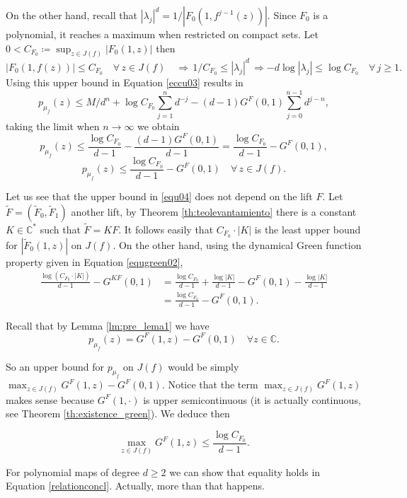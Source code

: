 On the other hand, recall that $|\lambda_j|^d = 1/|F_0(1,f^{j-1}(z))|$. Since $F_0$ is a polynomial, it reaches a maximum when restricted on compact sets. Let $0<C_{F_0}\coloneqq \sup_{z\in J(f)}|F_0(1,z)|$ then
$$|F_0(1,f(z))|\leq C_{F_0} \quad \forall\, z\in J(f)\quad \Rightarrow \, 1/C_{F_0} \leq |\lambda_j|^d  \, \Rightarrow -d \log|\lambda_j| \leq \log C_{F_0} \quad \forall \, j\geq 1.$$
Using this upper bound in Equation \eqref{eccu03} results in
$$p_{\mu_f}(z) \leq M/d^n + \log C_{F_0}\sum_{j=1}^{n}d^{-j} - (d-1)G^F(0,1)\sum_{j=0}^{n-1}d^{j-n},$$
taking the limit when $n\rightarrow \infty$ we obtain
$$p_{\mu_f}(z) \leq \frac{\log C_{F_0}}{d-1} -\frac{(d-1)G^F(0,1)}{d-1} = \frac{\log C_{F_0}}{d-1} -G^F(0,1),$$
\begin{equation}\label{equ04}
p_{\mu_f}(z) \leq \frac{\log C_{F_0}}{d-1} -G^F(0,1) \quad \forall\,z\in J(f).
\end{equation}

Let us see that the upper bound in \eqref{equ04} does not depend on the lift $F$. Let $\tilde{F}=(\tilde{F}_0,\tilde{F}_1)$ another lift, by Theorem \ref{th:teolevantamiento} there is a constant $K\in \mathbb{C}^*$ such that $\tilde{F} = K F$. It follows easily that $C_{F_0}\cdot |K|$ is the least upper bound for $|\tilde{F}_0(1,z)|$ on $J(f)$. On the other hand, using the dynamical Green function property given in Equation \eqref{equgreen02},
\begin{align*}
\frac{\log (C_{F_0}\cdot |K|)}{d-1} -G^{KF}(0,1) &= \frac{\log C_{F_0}}{d-1} + \frac{\log|K|}{d-1} -G^F(0,1)- \frac{\log |K|}{d-1}\\ 
&= \frac{\log C_{F_0}}{d-1}-G^F(0,1).
\end{align*}

Recall that by Lemma \ref{lm:pre_lema1} we have
$$p_{\mu_f}(z) = G^F(1,z)-G^F(0,1) \quad \forall z\in \mathbb{C}.$$

So an upper bound for $p_{\mu_f}$ on $J(f)$ would be simply $\max_{z\in J(f)} G^F(1,z)-G^F(0,1)$. Notice that the term $\max_{z\in J(f)} G^F(1,z)$ makes sense because $G^F(1,\cdot)$ is upper semicontinuous (it is actually continuous, see Theorem \ref{th:existence_green}). We deduce then

\begin{equation}\label{relationconcl}
\max_{z\in J(f)} G^F(1,z) \leq  \frac{\log C_{F_0}}{d-1}.
\end{equation}

For polynomial maps of degree $d\geq 2$ we can show that equality holds in Equation \eqref{relationconcl}. Actually, more than that happens.

